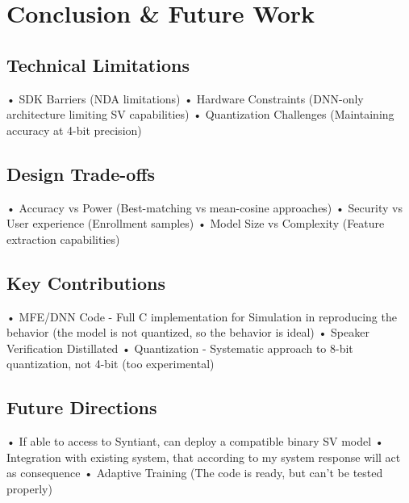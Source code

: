 \chapter{Conclusion \& Future Work}
\label{cha:conclusion}
\section{Technical Limitations}
\label{sec:technical limits}
• SDK Barriers (NDA limitations)\newline
• Hardware Constraints (DNN-only architecture limiting SV capabilities)\newline
• Quantization Challenges (Maintaining accuracy at 4-bit precision)\newline

\section{Design Trade-offs}
\label{sec:design trade-offs}
• Accuracy vs Power (Best-matching vs mean-cosine approaches)\newline
• Security vs User experience (Enrollment samples)\newline
• Model Size vs Complexity (Feature extraction capabilities)\newline

\section{Key Contributions}
\label{sec:key contributions}
• MFE/DNN Code - Full C implementation for Simulation in reproducing the behavior (the model is not quantized, so the behavior is ideal)\newline 
• Speaker Verification Distillated\newline 
• Quantization - Systematic approach to 8-bit quantization, not 4-bit (too experimental)\newline 

\section{Future Directions}
\label{sec:future directions}
• If able to access to Syntiant, can deploy a compatible binary SV model\newline 
• Integration with existing system, that according to my system response will act as consequence\newline
• Adaptive Training (The code is ready, but can't be tested properly)\newline 

\newpage